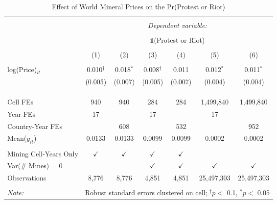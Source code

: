 
\begin{table}[ht!] \centering 
  \caption{Effect of World Mineral Prices on the Pr(Protest or Riot)} 
  \label{tab:did_price_acled} 
\begin{tabular}{@{\extracolsep{0pt}}lcccccc} 
\\[-1.8ex]\hline 
\hline \\[-1.8ex] 
 & \multicolumn{6}{c}{\textit{Dependent variable:}} \\ 
\cline{2-7} 
\\[-1.8ex] & \multicolumn{6}{c}{$\mathbb{1}$(Protest or Riot)} \\ 
\\[-1.8ex] & (1) & (2) & (3) & (4) & (5) & (6)\\ 
\hline \\[-1.8ex] 
 log(Price)$_{it}$ & 0.010$^{\dagger}$ & 0.018$^{*}$ & 0.008$^{\dagger}$ & 0.011 & 0.012$^{*}$ & 0.011$^{*}$ \\ 
  & (0.005) & (0.007) & (0.005) & (0.007) & (0.004) & (0.004) \\ 
  & & & & & & \\ 
\hline \\[-1.8ex] 
\hline \\[-1.8ex] Cell FEs & 940 & 940 & 284 & 284 & 1,499,840 & 1,499,840 \\ 
Year FEs & 17 &  & 17 &  & 17 &  \\ 
Country-Year FEs &  & 608 &  & 532 &  & 952 \\ 
Mean($y_{it}$) & 0.0133 & 0.0133 & 0.0099 & 0.0099 & 0.0002 & 0.0002 \\ 
\hline \\[-1.8ex] Mining Cell-Years Only & $\checkmark$ & $\checkmark$ & $\checkmark$ & $\checkmark$ &  &  \\ 
Var(\# Mines) = 0 &  &  & $\checkmark$ & $\checkmark$ & $\checkmark$ & $\checkmark$ \\ 
Observations & 8,776 & 8,776 & 4,851 & 4,851 & 25,497,303 & 25,497,303 \\ 
\hline 
\hline \\[-1.8ex] 
\textit{Note:}  & \multicolumn{6}{r}{Robust standard errors clustered on cell; $^{\dagger} p <$ 0.1, $^*p <$ 0.05} \\ 
\end{tabular} 
\end{table} 
